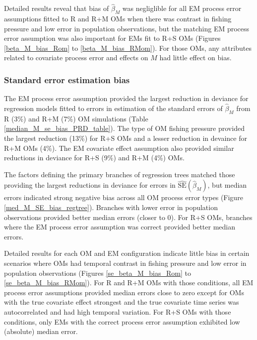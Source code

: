 \documentclass[
  12pt,
]{article}
\begin{document}
Detailed results reveal that bias of \(\widehat \beta_M\) was negliglible for all EM process error assumptions fitted to R and R+M OMs when there was contrast in fishing pressure and low error in population observations, but the matching EM process error assumption was also important for EMs fit to R+S OMs (Figures \ref{beta_M_bias_Rom} to \ref{beta_M_bias_RMom}). For those OMs, any attributes related to covariate process error and effects on \(M\) had little effect on bias.

\subsubsection*{Standard error estimation bias}\label{standard-error-estimation-bias-1}

The EM process error assumption provided the largest reduction in deviance for regression models fitted to errors in estimation of the standard errors of \(\widehat \beta_M\) from R (3\%) and R+M (7\%) OM simulations (Table \ref{median_M_se_bias_PRD_table}). The type of OM fishing pressure provided the largest reduction (13\%) for R+S OMs and a lesser reduction in devaince for R+M OMs (4\%). The EM covariate effect assumption also provided similar reductions in deviance for R+S (9\%) and R+M (4\%) OMs.

The factors defining the primary branches of regression trees matched those providing the largest reductions in deviance for errors in \(\widehat {\text{SE}}\left(\widehat\beta_M\right)\), but median errors indicated strong negative bias across all OM process error types (Figure \ref{med_M_SE_bias_regtree}). Branches with lower error in population observations provided better median errors (closer to 0). For R+S OMs, branches where the EM process error assumption was correct provided better median errors.

Detailed results for each OM and EM configuration indicate little bias in certain scenarios where OMs had temporal contrast in fishing pressure and low error in population observations (Figures \ref{se_beta_M_bias_Rom} to \ref{se_beta_M_bias_RMom}). For R and R+M OMs with those conditions, all EM process error assumptions provided median errors close to zero except for OMs with the true covariate effect strongest and the true covariate time series was autocorrelated and had high temporal variation. For R+S OMs with those conditions, only EMs with the correct process error assumption exhibited low (absolute) median error.
\end{document}
